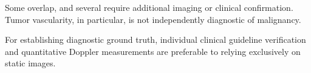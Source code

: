  Some overlap, and several require additional imaging or clinical confirmation. Tumor vascularity, in particular, is not independently diagnostic of malignancy.

For establishing diagnostic ground truth, individual clinical guideline verification and quantitative Doppler measurements are preferable to relying exclusively on static images.
